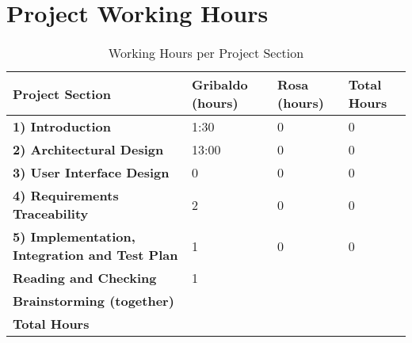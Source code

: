 \section*{Project Working Hours}

\begin{table}[ht!]
\centering
\begin{tabular}{|p{6cm}|p{2.5cm}|p{2.5cm}|p{2.5cm}|}
\hline
\textbf{Project Section} & \textbf{Gribaldo (hours)} & \textbf{Rosa (hours)} & \textbf{Total Hours} \\
\hline
\textbf{ 1) Introduction}                   & 1:30   & 0   & 0   \\
\textbf{ 2) Architectural Design}            & 13:00    & 0  & 0   \\
\textbf{ 3) User Interface Design}          &  0    & 0   & 0   \\
\textbf{ 4) Requirements Traceability}    & 2     & 0      & 0   \\
\textbf{ 5) Implementation, Integration and Test Plan}    & 1     & 0      & 0   \\
\hline
\textbf{Reading and Checking} & 1 &  &    \\
\hline
\textbf{Brainstorming (together)} &  &   & \\
\hline
\textbf{Total Hours}     &       &     &     \\
\hline
\end{tabular}
\caption{Working Hours per Project Section}
\label{tab:working_hours}
\end{table}

\vspace*{\fill}
